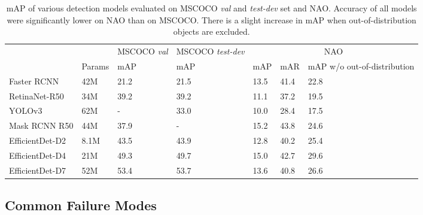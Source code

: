 \documentclass[final]{cvpr}
\begin{document}
\begin{table*}
\begin{center}
\begin{tabular}{l|l|l|l|l|l|l|}
\cline{2-7}
                                      &        & \multicolumn{1}{c|}{MSCOCO \textit{val}} & MSCOCO \textit{test-dev} & \multicolumn{3}{c|}{NAO}                  \\ \cline{2-7} 
                                      & Params & mAP                             & mAP             & mAP  & mAR  & mAP w/o out-of-distribution \\ \hline
\multicolumn{1}{|l|}{Faster RCNN}     & 42M    & 21.2                            & 21.5            & 13.5 & 41.4 & 22.8                        \\ \cline{1-1}
\multicolumn{1}{|l|}{RetinaNet-R50}   & 34M    & 39.2                            & 39.2            & 11.1 & 37.2 & 19.5                        \\ \cline{1-1}
\multicolumn{1}{|l|}{YOLOv3}          & 62M    & -                               & 33.0            & 10.0 & 28.4 & 17.5                        \\ \cline{1-1}
\multicolumn{1}{|l|}{Mask RCNN R50}   & 44M    & 37.9                            & -               & 15.2 & 43.8 & 24.6                        \\ \cline{1-1}
\multicolumn{1}{|l|}{EfficientDet-D2} & 8.1M   & 43.5                            & 43.9            & 12.8 & 40.2 & 25.4                        \\ \cline{1-1}
\multicolumn{1}{|l|}{EfficientDet-D4} & 21M    & 49.3                            & 49.7            & 15.0 & 42.7 & 29.6                        \\ \cline{1-1}
\multicolumn{1}{|l|}{EfficientDet-D7} & 52M    & 53.4                            & 53.7            & 13.6 & 40.8 & 26.6                        \\ \cline{1-1}
\hline
\end{tabular}
\end{center}
\caption{mAP of various detection models evaluated on MSCOCO \textit{val} and \textit{test-dev} set and NAO. Accuracy of all models were significantly lower on NAO than on MSCOCO. There is a slight increase in mAP when out-of-distribution objects are excluded.}
\label{table:evaluation_results}
\end{table*}

\subsection{Common Failure Modes}
\end{document}

